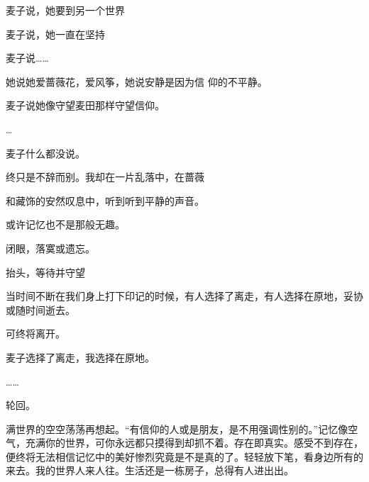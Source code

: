 \documentclass{article}
\begin{document}
麦子说，她要到另一个世界 


麦子说，她一直在坚持 


麦子说…… 

她说她爱蔷薇花，爱风筝，她说安静是因为信
仰的不平静。 


麦子说她像守望麦田那样守望信仰。 


… 


麦子什么都没说。 

终只是不辞而别。我却在一片乱落中，在蔷薇
\newpage

和藏饰的安然叹息中，听到听到平静的声音。 


或许记忆也不是那般无趣。 


闭眼，落寞或遗忘。 


抬头，等待并守望 

当时间不断在我们身上打下印记的时候，有人选择了离走，有人选择在原地，妥协或随时间逝去。
 


可终将离开。 


麦子选择了离走，我选择在原地。 



…… 


轮回。 

\newpage

满世界的空空荡荡再想起。“有信仰的人或是朋友，是不用强调性别的。”记忆像空气，充满你的世界，可你永远都只摸得到却抓不着。存在即真实。感受不到存在，便终将无法相信记忆中的美好惨烈究竟是不是真的了。轻轻放下笔，看身边所有的来去。我的世界人来人往。生活还是一栋房子，总得有人进出出。
\end{document}

